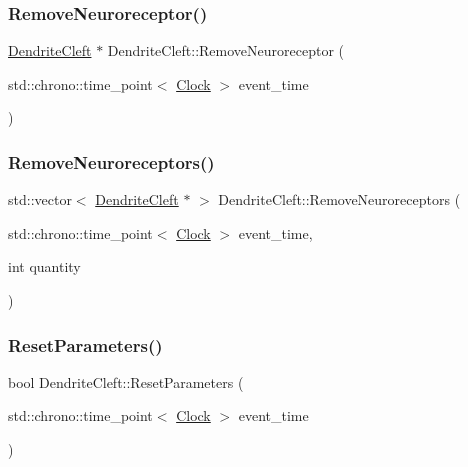 \mbox{\label{classDendriteCleft_afaf06d4516355dfe2e0e4c33a00f0f1d}} 
\subsubsection{\texorpdfstring{Remove\+Neuroreceptor()}{RemoveNeuroreceptor()}}
{\footnotesize\ttfamily \mbox{\hyperlink{classDendriteCleft}{Dendrite\+Cleft}} $\ast$ Dendrite\+Cleft\+::\+Remove\+Neuroreceptor (\begin{DoxyParamCaption}\item[{std\+::chrono\+::time\+\_\+point$<$ \mbox{\hyperlink{universe_8h_a0ef8d951d1ca5ab3cfaf7ab4c7a6fd80}{Clock}} $>$}]{event\+\_\+time }\end{DoxyParamCaption})}

\mbox{\label{classDendriteCleft_ac29b12d4abcc47fa298ab9e95f578f0e}} 
\subsubsection{\texorpdfstring{Remove\+Neuroreceptors()}{RemoveNeuroreceptors()}}
{\footnotesize\ttfamily std\+::vector$<$ \mbox{\hyperlink{classDendriteCleft}{Dendrite\+Cleft}} $\ast$ $>$ Dendrite\+Cleft\+::\+Remove\+Neuroreceptors (\begin{DoxyParamCaption}\item[{std\+::chrono\+::time\+\_\+point$<$ \mbox{\hyperlink{universe_8h_a0ef8d951d1ca5ab3cfaf7ab4c7a6fd80}{Clock}} $>$}]{event\+\_\+time,  }\item[{int}]{quantity }\end{DoxyParamCaption})}

\mbox{\label{classDendriteCleft_a3fee388d7023cfb460412e0322244ae2}} 
\subsubsection{\texorpdfstring{Reset\+Parameters()}{ResetParameters()}}
{\footnotesize\ttfamily bool Dendrite\+Cleft\+::\+Reset\+Parameters (\begin{DoxyParamCaption}\item[{std\+::chrono\+::time\+\_\+point$<$ \mbox{\hyperlink{universe_8h_a0ef8d951d1ca5ab3cfaf7ab4c7a6fd80}{Clock}} $>$}]{event\+\_\+time }\end{DoxyParamCaption})}


